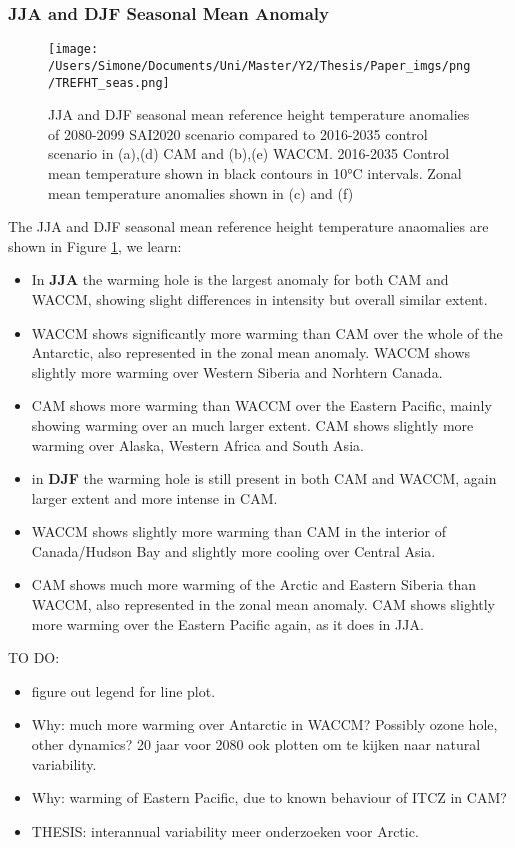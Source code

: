 \subsubsection{JJA and DJF Seasonal Mean Anomaly}

\begin{figure}[H]
	\centering
	\texttt{[image: /Users/Simone/Documents/Uni/Master/Y2/Thesis/Paper\_imgs/png/TREFHT\_seas.png]}
	\caption{JJA and DJF seasonal mean reference height temperature anomalies of 2080-2099 SAI2020 scenario compared to 2016-2035 control scenario in (a),(d) CAM and (b),(e) WACCM. 2016-2035 Control mean temperature shown in black contours in 10°C intervals. Zonal mean temperature anomalies shown in (c) and (f)}
	\label{fig:TREFHT_seas}
\end{figure}

The JJA and DJF seasonal mean reference height temperature anaomalies are shown in Figure \ref{fig:TREFHT_seas}, we learn:

\begin{itemize}
	\item In \textbf{JJA} the warming hole is the largest anomaly for both CAM and WACCM, showing slight differences in intensity but overall similar extent.
	\item WACCM shows significantly more warming than CAM over the whole of the Antarctic, also represented in the zonal mean anomaly. WACCM shows slightly more warming over Western Siberia and Norhtern Canada. 
	\item CAM shows more warming than WACCM over the Eastern Pacific, mainly showing warming over an much larger extent. CAM shows slightly more warming over Alaska, Western Africa and South Asia. 
	\item in \textbf{DJF} the warming hole is still present in both CAM and WACCM, again larger extent and more intense in CAM. 
	\item WACCM shows slightly more warming than CAM in the interior of Canada/Hudson Bay and slightly more cooling over Central Asia. 
	\item CAM shows much more warming of the Arctic and Eastern Siberia than WACCM, also represented in the zonal mean anomaly. CAM shows slightly more warming over the Eastern Pacific again, as it does in JJA.
\end{itemize}

TO DO:
\begin{itemize}
	\item figure out legend for line plot.
	\item Why: much more warming over Antarctic in WACCM? Possibly ozone hole, other dynamics? 20 jaar voor 2080 ook plotten om te kijken naar natural variability.
	\item Why: warming of Eastern Pacific, due to known behaviour of ITCZ in CAM?
	\item THESIS: interannual variability meer onderzoeken voor Arctic.
\end{itemize}



